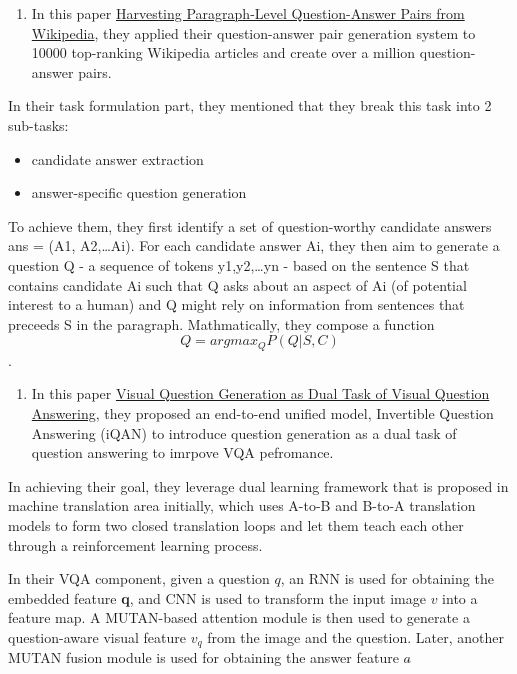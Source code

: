 \documentclass{acm_proc_article-sp}
\providecommand{\tightlist}{%
  \setlength{\itemsep}{0pt}\setlength{\parskip}{0pt}}
\begin{document}
\begin{enumerate}
\def\labelenumi{\arabic{enumi}.}
\setcounter{enumi}{1}
\tightlist
\item
  In this paper \href{https://arxiv.org/pdf/1805.05942.pdf}{Harvesting
  Paragraph-Level Question-Answer Pairs from Wikipedia}, they applied
  their question-answer pair generation system to 10000 top-ranking
  Wikipedia articles and create over a million question-answer pairs.
\end{enumerate}

In their task formulation part, they mentioned that they break this task
into 2 sub-tasks:

\begin{itemize}
\item
  candidate answer extraction
\item
  answer-specific question generation
\end{itemize}

To achieve them, they first identify a set of question-worthy candidate
answers ans = (A1, A2,\ldots{}Ai). For each candidate answer Ai, they
then aim to generate a question Q - a sequence of tokens
y1,y2,\ldots{}yn - based on the sentence S that contains candidate Ai
such that Q asks about an aspect of Ai (of potential interest to a
human) and Q might rely on information from sentences that preceeds S in
the paragraph. Mathmatically, they compose a function
\[Q = argmax_Q P(Q|S,C)\].

\begin{enumerate}
\def\labelenumi{\arabic{enumi}.}
\setcounter{enumi}{2}
\tightlist
\item
  In this paper
  \href{http://cvboy.com/pdf/publications/cvpr2018_iqan.pdf}{Visual
  Question Generation as Dual Task of Visual Question Answering}, they
  proposed an end-to-end unified model, Invertible Question Answering
  (iQAN) to introduce question generation as a dual task of question
  answering to imrpove VQA pefromance.
\end{enumerate}

In achieving their goal, they leverage dual learning framework that is
proposed in machine translation area initially, which uses A-to-B and
B-to-A translation models to form two closed translation loops and let
them teach each other through a reinforcement learning process.

In their VQA component, given a question \(q\), an RNN is used for
obtaining the embedded feature \textbf{q}, and CNN is used to transform
the input image \(v\) into a feature map. A MUTAN-based attention module
is then used to generate a question-aware visual feature \(v_q\) from
the image and the question. Later, another MUTAN fusion module is used
for obtaining the answer feature \(a\hat{}\)
\end{document}
